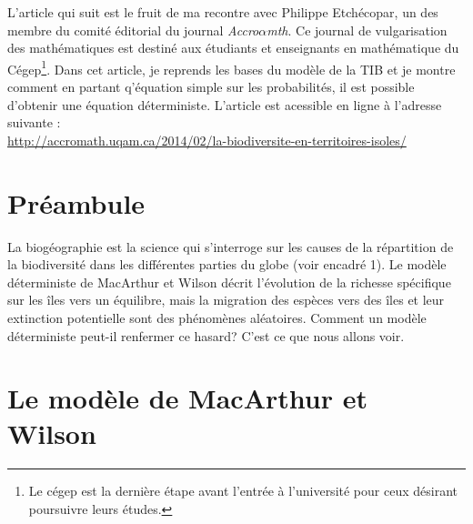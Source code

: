 \label{annI}
\addtocounter{chapter}{1}
\setcounter{equation}{0}



L'article qui suit est le fruit de ma recontre avec Philippe Etchécopar, un des membre du comité éditorial du journal \emph{Accro$\alpha$mth}.
Ce journal de vulgarisation des mathématiques est destiné aux étudiants et enseignants en mathématique du Cégep\footnote{Le cégep est la dernière étape avant l'entrée à l'université pour ceux désirant poursuivre leurs études.}.
Dans cet article, je reprends les bases du modèle de la TIB et je montre comment en partant q'équation simple sur les probabilités, il est possible d'obtenir une équation déterministe. L'article est acessible en ligne à l'adresse suivante : \\ \url{http://accromath.uqam.ca/2014/02/la-biodiversite-en-territoires-isoles/}


\section*{Préambule}
	La biogéographie est la science qui s’interroge sur les causes de la répartition de la biodiversité dans les différentes parties du globe (voir encadré 1). Le modèle déterministe de MacArthur et Wilson décrit l’évolution de la richesse spécifique sur les îles vers un équilibre, mais la migration des espèces vers des îles et leur extinction potentielle sont des phénomènes aléatoires. Comment un modèle déterministe peut-il renfermer ce hasard? C’est ce que nous allons voir.

\section*{Le modèle de MacArthur et Wilson}

